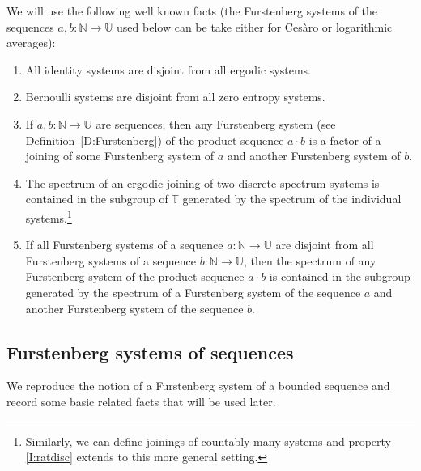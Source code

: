 \documentclass[11pt]{amsart}
\theoremstyle{definition}
\newcommand{\N}{{\mathbb N}}
\newcommand{\T}{{\mathbb T}}
\newcommand{\U}{{\mathbb U}}
\begin{document}
We will use the following well known facts (the Furstenberg systems of the sequences $a,b\colon \N\to \U$ used below can be take either for Ces\`aro or logarithmic averages):
\begin{enumerate}
	\item All identity systems are disjoint from all ergodic systems.
	
	\smallskip
	
	\item Bernoulli systems are disjoint from all zero entropy systems.
	
	\smallskip
	
	\item\label{I:ab}  If $a,b\colon \N\to \U$ are sequences, then any Furstenberg system (see Definition~\ref{D:Furstenberg}) of the product sequence $a\cdot b$ is a factor of a joining of some Furstenberg system of $a$ and another Furstenberg system of $b$.
	
	\smallskip
	
	\item\label{I:ratdisc} The spectrum of an ergodic joining of two discrete spectrum systems is contained in the subgroup of $\T$ generated by the spectrum of the individual
	systems.\footnote{Similarly, we can define joinings of countably many systems and property  \eqref{I:ratdisc} extends to this
		more general setting.}
	
	\smallskip
	
	\item If all  Furstenberg systems of a sequence $a\colon \N\to \U$ are disjoint from all Furstenberg systems of a sequence $b\colon \N\to \U$,
	then the spectrum of any Furstenberg system of the  product sequence $a\cdot b$
is contained in the subgroup generated by the spectrum of  a Furstenberg system of the sequence $a$ and another Furstenberg system of the sequence $b$.
\end{enumerate}


\subsection{Furstenberg systems of sequences}\label{SS:Defs}
 We reproduce the notion of a Furstenberg system of a bounded sequence
  and record some basic related facts that will be used later.
\end{document}
